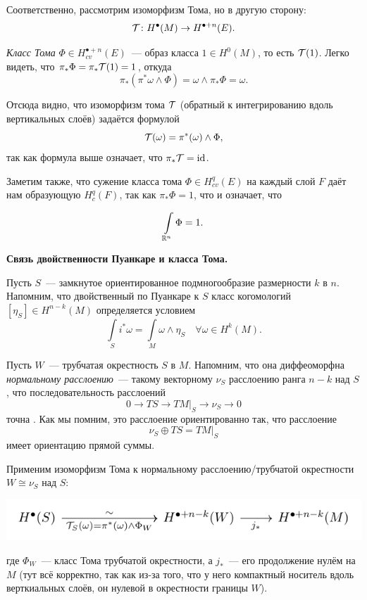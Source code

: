  	 	Соответственно, рассмотрим изоморфизм Тома, но в другую сторону: 
 	 	\[
 	 		\mathcal{T}\colon H^{\bullet}(M) \to H^{\bullet + n}(E). 
 	 	\]

 	 	\emph{Класс Тома} $\Phi \in H_{cv}^{\bullet + n}(E) $~--- образ класса $1 \in H^{0}(M)$, то есть $\mathcal{T}(1)$. Легко видеть, что $\pi_* \Phi = \pi_* \mathcal{T}(1) = 1$, откуда 
 	 	\[
 	 		\pi_*(\pi^*\omega \wedge \Phi) = \omega \wedge \pi_*\Phi = \omega. 
 	 	\]

 	 	 Отсюда видно, что изоморфизм тома $\mathcal{T}$ (обратный к интегрированию вдоль вертикальных слоёв) задаётся формулой 
 	 	 \[
 	 	 	\mathcal{T}(\omega) = \pi^*(\omega) \wedge \Phi,
 	 	 \]
 	 	 так как формула выше означает, что $\pi_* \mathcal{T} = \operatorname{id}$. 

 	 	 Заметим также, что сужение класса тома $\Phi \in H^q_{cv}(E)$ на каждый слой $F$ даёт нам образующую $H^q_{c}(F)$, так как $\pi_* \Phi = 1$, что и означает, что 

 	 	 \[
 	 	 	\int\limits_{\mathbb{R}^n} \Phi = 1.
 	 	 \]

 	 	 \noindent\bf{Связь двойственности Пуанкаре и класса Тома.}

 	 	 Пусть $S$~--- замкнутое ориентированное подмногообразие размерности $k$ в $n$. Напомним, что двойственный по Пуанкаре к $S$ класс когомологий $[\eta_S] \in H^{n - k}(M)$ определяется условием 
 	 	 \[
 	 	 	\int\limits_{S} i^* \omega = \int\limits_{M} \omega \wedge \eta_S \quad \forall \omega \in H^k(M).
 	 	 \]


 	 	 Пусть $W$~--- трубчатая окрестность $S$ в $M$. Напомним, что она диффеоморфна \emph{нормальному расслоению}~--- такому векторному $\nu_S$ расслоению ранга $n - k$ над $S$, что последовательность расслоений
 	 	 \[
 	 	 	0 \to TS \to TM\vert_{S} \to \nu_S \to 0
 	 	 \]
 	 	 точна . Как мы помним, это расслоение ориентированно так, что расслоение 
 	 	 \[
 	 	 	\nu_S \oplus TS = TM\vert_{S}
 	 	 \]
 	 	 имеет ориентацию прямой суммы. 

 	 	 Применим изоморфизм Тома к нормальному расслоению/трубчатой окрестности $W \cong \nu_S$ над $S$:

 	 	 \begin{center}
 	 	 	\includegraphics{lectures/7/pictures/cd_29.pdf}
 	 	 \end{center}

 	 	 где $\Phi_{W}$~--- класс Тома трубчатой окрестности, а $j_*$~--- его продолжение нулём на $M$ (тут всё корректно, так как из-за того, что у него компактный носитель вдоль верткиальных слоёв, он нулевой в окрестности границы $W$). 

